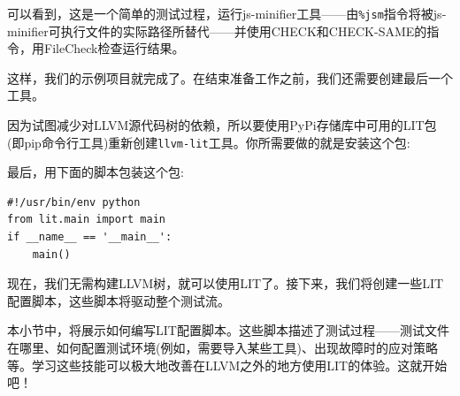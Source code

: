 可以看到，这是一个简单的测试过程，运行js-minifier工具——由\texttt{\%jsm}指令将被js-minifier可执行文件的实际路径所替代——并使用CHECK和CHECK-SAME的指令，用FileCheck检查运行结果。

这样，我们的示例项目就完成了。在结束准备工作之前，我们还需要创建最后一个工具。

因为试图减少对LLVM源代码树的依赖，所以要使用PyPi存储库中可用的LIT包(即pip命令行工具)重新创建\texttt{llvm-lit}工具。你所需要做的就是安装这个包:


最后，用下面的脚本包装这个包:

\begin{lstlisting}[style=stylePython]
#!/usr/bin/env python
from lit.main import main
if __name__ == '__main__':
	main()
\end{lstlisting}

现在，我们无需构建LLVM树，就可以使用LIT了。接下来，我们将创建一些LIT配置脚本，这些脚本将驱动整个测试流。


本小节中，将展示如何编写LIT配置脚本。这些脚本描述了测试过程——测试文件在哪里、如何配置测试环境(例如，需要导入某些工具)、出现故障时的应对策略等。学习这些技能可以极大地改善在LLVM之外的地方使用LIT的体验。这就开始吧！

